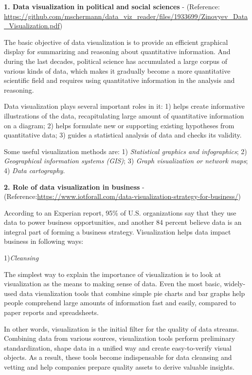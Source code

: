 \documentclass[]{book}
\theoremstyle{definition}
\theoremstyle{definition}
\theoremstyle{definition}
\theoremstyle{remark}
\begin{document}
\textbf{1. Data visualization in political and social sciences} -
(Reference:
\url{https://github.com/mschermann/data_viz_reader/files/1933699/Zinovyev_Data_Visualization.pdf})

The basic objective of data visualization is to provide an efficient
graphical display for summarizing and reasoning about quantitative
information. And during the last decades, political science has
accumulated a large corpus of various kinds of data, which makes it
gradually become a more quantitative scientific field and requires using
quantitative information in the analysis and reasoning.

Data visualization plays several important roles in it: 1) helps create
informative illustrations of the data, recapitulating large amount of
quantitative information on a diagram; 2) helps formulate new or
supporting existing hypotheses from quantitative data; 3) guides a
statistical analysis of data and checks its validity.

Some useful visualization methods are: 1) \emph{Statistical graphics and
infographics}; 2) \emph{Geographical information systems (GIS)}; 3)
\emph{Graph visualization or network maps}; 4) \emph{Data cartography}.

\textbf{2. Role of data visualization in business}
-(Reference:\url{https://www.iotforall.com/data-visualization-strategy-for-business/})

According to an Experian report, 95\% of U.S. organizations say that
they use data to power business opportunities, and another 84 percent
believe data is an integral part of forming a business strategy.
Visualization helps data impact business in following ways:

1)\emph{Cleansing}

The simplest way to explain the importance of visualization is to look
at visualization as the means to making sense of data. Even the most
basic, widely-used data visualization tools that combine simple pie
charts and bar graphs help people comprehend large amounts of
information fast and easily, compared to paper reports and spreadsheets.

In other words, visualization is the initial filter for the quality of
data streams. Combining data from various sources, visualization tools
perform preliminary standardization, shape data in a unified way and
create easy-to-verify visual objects. As a result, these tools become
indispensable for data cleansing and vetting and help companies prepare
quality assets to derive valuable insights.
\end{document}
